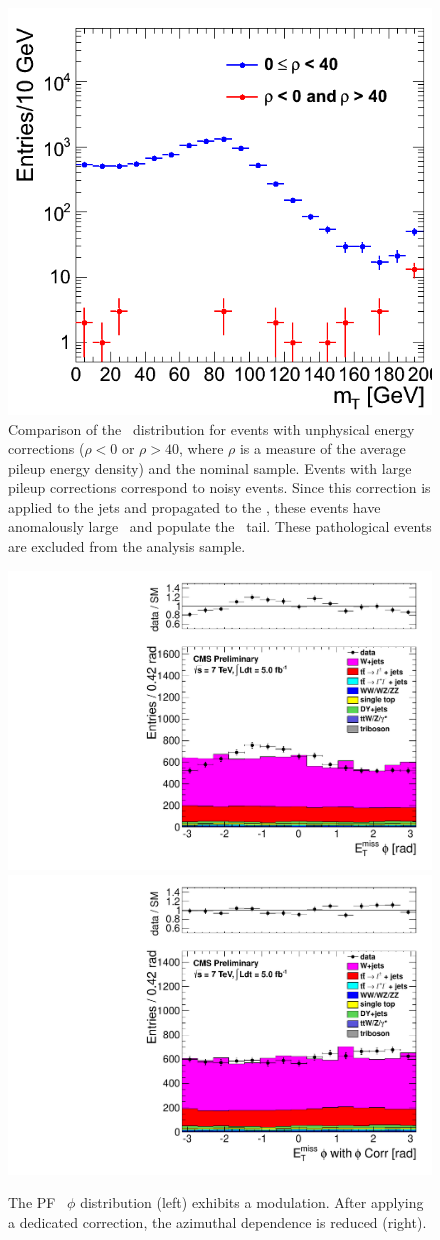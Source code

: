 \clearpage

\begin{figure}[!ht]
  \begin{center}
	\includegraphics[width=0.5\linewidth]{plots/mt_rho_comp.png}
	\caption{ \label{fig:mtrhocomp}%
	  Comparison of the \mt\ distribution for events with
          unphysical energy corrections ($\rho <0$ or $ \rho > 40$, where $\rho$ is a
          measure of the average pileup energy density) and the
          nominal sample. Events with large pileup corrections 
          correspond to noisy events. Since this correction is applied
          to the jets and propagated to the \met, these events have
          anomalously large \met\ and populate the \mt\ tail. These
          pathological events are excluded from the analysis sample.}
  \end{center}
\end{figure}

\begin{figure}[!hb]
  \begin{center}
	\includegraphics[width=0.5\linewidth]{plots/metphi.pdf}%
	\includegraphics[width=0.5\linewidth]{plots/metphi_phicorr.pdf}
	\caption{ \label{fig:metphicomp}%
	  The PF \met\ $\phi$ distribution (left) exhibits a
          modulation. After applying a dedicated correction, the
          azimuthal dependence is reduced (right).}
  \end{center}
\end{figure}

